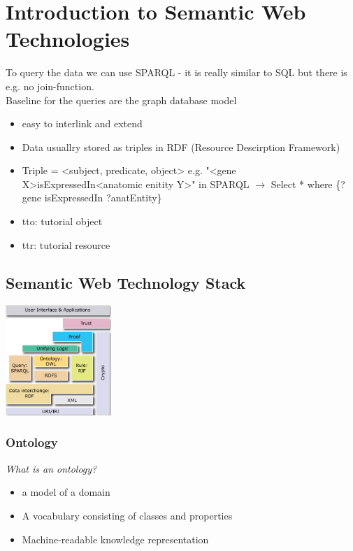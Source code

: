 \documentclass{report}
\newenvironment{Figure}
	{\par\medskip\noindent\minipage{\linewidth}}
	{\endminipage\par\medskip}
\theoremstyle{definition}
\theoremstyle{example}
\begin{document}
\chapter{Introduction to Semantic Web Technologies}

To query the data we can use SPARQL - it is really similar to SQL but there is e.g. no join-function. \\
Baseline for the queries are the graph database model
\begin{itemize}
   \item easy to interlink and extend
   \item Data usuallry stored as triples in RDF (Resource Descirption Framework)
   \item Triple = <subject, predicate, object>
   \subitem e.g. "<gene X>isExpressedIn<anatomic enitity Y>"
   \subitem in SPARQL $\rightarrow$ Select * where \{?gene isExpressedIn ?anatEntity\}
   \item tto: tutorial object
   \item ttr: tutorial resource
\end{itemize}

\section{Semantic Web Technology Stack}

\begin{Figure}
   \centering
    \includegraphics[width=150px]{img/SemanticWebTechStack.png}
        \label{fig:Semantic Web Technology Stack}
\end{Figure}

\subsection{Ontology}
\textit{What is an ontology?}
\begin{itemize}
   \item a model of a domain
   \item A vocabulary consisting of classes and properties
   \item Machine-readable knowledge representation
\end{itemize}
\end{document}
